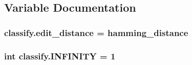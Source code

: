 \subsection{Variable Documentation}
\hypertarget{namespaceclassify_a5dd83ee698e3862948092cc5a3d4f735}{}
\subsubsection[{edit\+\_\+distance}]{\setlength{\rightskip}{0pt plus 5cm}classify.\+edit\+\_\+distance = {\bf hamming\+\_\+distance}}\label{namespaceclassify_a5dd83ee698e3862948092cc5a3d4f735}
\hypertarget{namespaceclassify_a065cd3de81830bc79376bb6be8b41487}{}
\subsubsection[{I\+N\+F\+I\+N\+I\+T\+Y}]{\setlength{\rightskip}{0pt plus 5cm}int classify.\+I\+N\+F\+I\+N\+I\+T\+Y = 1}\label{namespaceclassify_a065cd3de81830bc79376bb6be8b41487}
